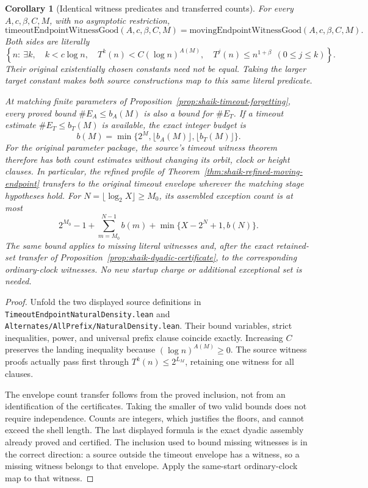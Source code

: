 \documentclass[11pt]{article}
\newtheorem{corollary}[proposition]{Corollary}
\theoremstyle{remark}\newtheorem{remark}[proposition]{Remark}
\begin{document}
\begin{corollary}[Identical witness predicates and transferred counts]
\label{cor:shaik-identical-endpoint-witness}
For every \(A,c,\beta,C,M\), with no asymptotic restriction,
\begin{equation}\label{eq:shaik-literal-witness-equality}
 \mathrm{timeoutEndpointWitnessGood}(A,c,\beta,C,M)
 =
 \mathrm{movingEndpointWitnessGood}(A,c,\beta,C,M).
\end{equation}
Both sides are literally
\[
 \left\{n:\ \exists k,\quad
 k<c\log n,\quad T^k(n)<C(\log n)^{A(M)},\quad
 T^j(n)\le n^{1+\beta}\ \ (0\le j\le k)\right\}.
\]
Their original existentially chosen constants need not be equal.
Taking the larger target constant makes both source constructions map
to this same literal predicate.

At matching finite parameters of Proposition~\ref{prop:shaik-timeout-forgetting},
every proved bound \(\#E_A\le b_A(M)\) is also a bound for \(\#E_T\).
If a timeout estimate \(\#E_T\le b_T(M)\) is available, the exact
integer budget is
\[
 b(M)=\min\{2^M,\lfloor b_A(M)\rfloor,\lfloor b_T(M)\rfloor\}.
\]
For the original parameter package, the source's timeout witness theorem
therefore has both count estimates without changing its orbit, clock or
height clauses. In particular, the refined profile of
Theorem~\ref{thm:shaik-refined-moving-endpoint} transfers to the original
timeout envelope wherever the matching stage hypotheses hold.
For \(N=\lfloor\log_2X\rfloor\ge M_0\), its assembled exception count is
at most
\[
 2^{M_0}-1+\sum_{m=M_0}^{N-1}b(m)+
                   \min\{X-2^N+1,b(N)\}.
\]
The same bound applies to missing literal witnesses and, after the exact
retained-set transfer of Proposition~\ref{prop:shaik-dyadic-certificate},
to the corresponding ordinary-clock witnesses. No new startup charge
or additional exceptional set is needed.
\end{corollary}
\begin{proof}
Unfold the two displayed source definitions in
\texttt{TimeoutEndpointNaturalDensity.lean} and
\texttt{Alternates/AllPrefix/NaturalDensity.lean}. Their bound variables,
strict inequalities, power, and universal prefix clause coincide exactly.
Increasing \(C\) preserves the landing inequality because
\((\log n)^{A(M)}\ge0\). The source witness proofs actually pass first
through \(T^k(n)\le2^{L_M}\), retaining one witness for all clauses.

The envelope count transfer follows from the proved inclusion, not from
an identification of the certificates. Taking the smaller of two valid
bounds does not require independence. Counts are integers, which justifies
the floors, and cannot exceed the shell length. The last displayed formula
is the exact dyadic assembly already proved and certified. The inclusion
used to bound missing witnesses is in the correct direction: a source outside
the timeout envelope has a witness, so a missing witness belongs to that
envelope. Apply the same-start ordinary-clock map to that witness.
\end{proof}
\end{document}
